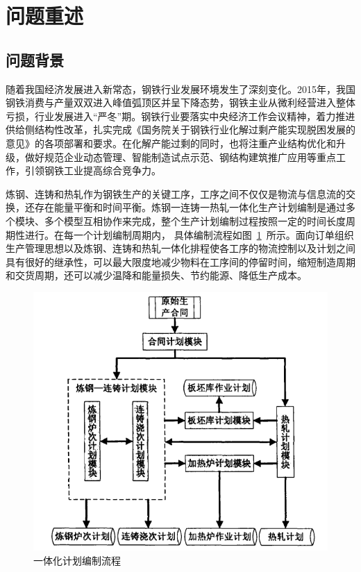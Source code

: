 \documentclass{whutmod}
\begin{document}
\thispagestyle{empty}
\tableofcontents
\setcounter{page}{0}                                      
\newpage	%

\section{问题重述}	
\subsection{问题背景}
随着我国经济发展进入新常态，钢铁行业发展环境发生了深刻变化。2015年，我国钢铁消费与产量双双进入峰值弧顶区并呈下降态势，钢铁主业从微利经营进入整体亏损，行业发展进入“严冬”期。钢铁行业要落实中央经济工作会议精神，着力推进供给侧结构性改革，扎实完成《国务院关于钢铁行业化解过剩产能实现脱困发展的意见》的各项部署和要求。在化解产能过剩的同时，也将注重产业结构优化和升级，做好规范企业动态管理、智能制造试点示范、钢结构建筑推广应用等重点工作，引领钢铁工业提高综合竞争力。

炼钢、连铸和热轧作为钢铁生产的关键工序，工序之间不仅仅是物流与信息流的交换，还存在能量平衡和时间平衡。炼钢一连铸一热轧一体化生产计划编制是通过多个模块、多个模型互相协作来完成，整个生产计划编制过程按照一定的时间长度周期性进行。在每一个计划编制周期内， 具体编制流程如图~\ref{111111}~所示。面向订单组织生产管理思想以及炼钢、连铸和热轧一体化排程使各工序的物流控制以及计划之间具有很好的继承性，可以最大限度地减少物料在工序间的停留时间，缩短制造周期和交货周期，还可以减少温降和能量损失、节约能源、降低生产成本。
\begin{figure}[H]
\centering
\includegraphics[width=.8\textwidth]{figures/asd.png}
\caption{一体化计划编制流程}\label{111111}
\end{figure}
\end{document}
